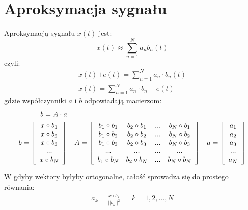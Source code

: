 \section{Aproksymacja sygnału}
    Aproksymacją sygnału $x(t)$ jest:
    \begin{equation*}
        x(t) \approx \sum_{n=1}^{N}a_nb_n(t)
    \end{equation*}
    czyli:
    \begin{align*}
        x(t)  \textbf{+}e(t) = \sum_{n=1}^{N}a_n\cdot b_n(t)\\
        x(t) = \sum_{n=1}^{N}a_n\cdot b_n-e(t)
    \end{align*}
    gdzie współczynniki $a$ i $b$ odpowiadają macierzom:
    \begin{align*}
        b = A \cdot a\\
        b = \left[\begin{array}{c}
            x\circ b_1\\
            x\circ b_2\\
            x\circ b_3\\
            ...\\
            x\circ b_N
        \end{array}\right] &&
        A = \left[\begin{array}{c c c c}
            b_1\circ b_1 & b_2\circ b_1 & ... & b_N\circ b_1\\
            b_1\circ b_2 & b_2\circ b_2 & ... & b_N\circ b_2\\
            b_1\circ b_3 & b_2\circ b_3 & ... & b_N\circ b_3\\
            ...          & ...          & ... & ...\\
            b_1\circ b_N & b_2\circ b_N & ... & b_N\circ b_N
        \end{array}\right] &&
        a = \left[\begin{array}{c}
            a_1\\
            a_2\\
            a_3\\
            ...\\
            a_N
        \end{array}\right]
    \end{align*}

    W gdyby wektory byłyby ortogonalne, całość sprowadza się do prostego równania:
    \begin{align*}
        a_k = \frac{x\circ b_k}{||b_k||^2} && k = 1, 2, ..., N
    \end{align*}

